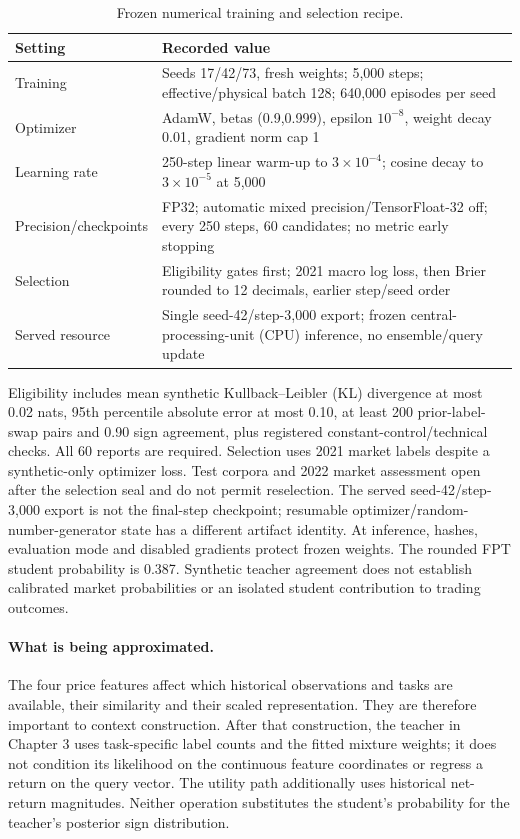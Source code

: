\begin{table}[!htb]\centering\small{}
\caption[Numerical training and selection]{Frozen numerical training and selection recipe.}\label{tab:student}
\begin{tabular}{@{}P{.25\linewidth}P{.69\linewidth}@{}}\toprule
Setting & Recorded value\\\midrule
Training & Seeds 17/42/73, fresh weights; 5,000 steps; effective/physical batch 128; 640,000 episodes per seed\\
Optimizer & AdamW, betas (0.9,0.999), epsilon $10^{-8}$, weight decay 0.01, gradient norm cap 1\\
Learning rate & 250-step linear warm-up to $3\times10^{-4}$; cosine decay to $3\times10^{-5}$ at 5,000\\
Precision/checkpoints & FP32; automatic mixed precision/TensorFloat-32 off; every 250 steps, 60 candidates; no metric early stopping\\
Selection & Eligibility gates first; 2021 macro log loss, then Brier rounded to 12 decimals, earlier step/seed order\\
Served resource & Single seed-42/step-3,000 export; frozen central-processing-unit (CPU) inference, no ensemble/query update\\\bottomrule
\end{tabular}\end{table}

Eligibility includes mean synthetic Kullback--Leibler (KL) divergence at most 0.02 nats, 95th percentile
absolute error at most 0.10, at least 200 prior-label-swap pairs and 0.90
sign agreement, plus registered constant-control/technical checks. All
60 reports are required. Selection uses 2021 market labels despite a
synthetic-only optimizer loss. Test corpora and 2022 market assessment
open after the selection seal and do not permit reselection. The served
seed-42/step-3,000 export is not the final-step checkpoint; resumable
optimizer/random-number-generator state has a different artifact identity. At inference,
hashes, evaluation mode and disabled gradients protect frozen weights.
The rounded FPT student probability is 0.387. Synthetic
teacher agreement does not establish calibrated market probabilities or
an isolated student contribution to trading outcomes.

\paragraph{What is being approximated.}
The four price features affect which historical observations and tasks
are available, their similarity and their scaled representation. They
are therefore important to context construction. After that construction,
the teacher in Chapter 3 uses task-specific label counts and the fitted
mixture weights; it does not condition its likelihood on the continuous
feature coordinates or regress a return on the query vector. The utility
path additionally uses historical net-return magnitudes. Neither
operation substitutes the student's probability for the teacher's
posterior sign distribution.

